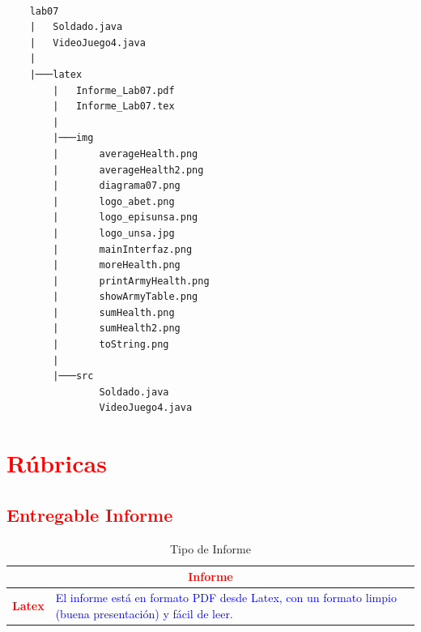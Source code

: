 \documentclass{article}
\begin{document}
\begin{lstlisting}[style=ascii-tree]

    lab07
    |   Soldado.java
    |   VideoJuego4.java
    |
    |───latex
        |   Informe_Lab07.pdf
        |   Informe_Lab07.tex
        |
        |───img
        |       averageHealth.png
        |       averageHealth2.png
        |       diagrama07.png
        |       logo_abet.png
        |       logo_episunsa.png
        |       logo_unsa.jpg
        |       mainInterfaz.png
        |       moreHealth.png
        |       printArmyHealth.png
        |       showArmyTable.png
        |       sumHealth.png
        |       sumHealth2.png
        |       toString.png
        |
        |───src
                Soldado.java
                VideoJuego4.java

\end{lstlisting}    

	\section{\textcolor{red}{Rúbricas}}
	
	\subsection{\textcolor{red}{Entregable Informe}}
	\begin{table}[H]
		\caption{Tipo de Informe}
		\setlength{\tabcolsep}{0.5em} %
		{\renewcommand{\arraystretch}{1.5} %
		\begin{tabular}{|p{3cm}|p{12cm}|}
			\hline
			\multicolumn{2}{|c|}{\textbf{\textcolor{red}{Informe}}}  \\
			\hline 
			\textbf{\textcolor{red}{Latex}} & \textcolor{blue}{El informe está en formato PDF desde Latex,  con un formato limpio (buena presentación) y fácil de leer.}   \\ 
			\hline 
			
			
		\end{tabular}
	}
	\end{table}
	
	\clearpage
 
\end{document}
